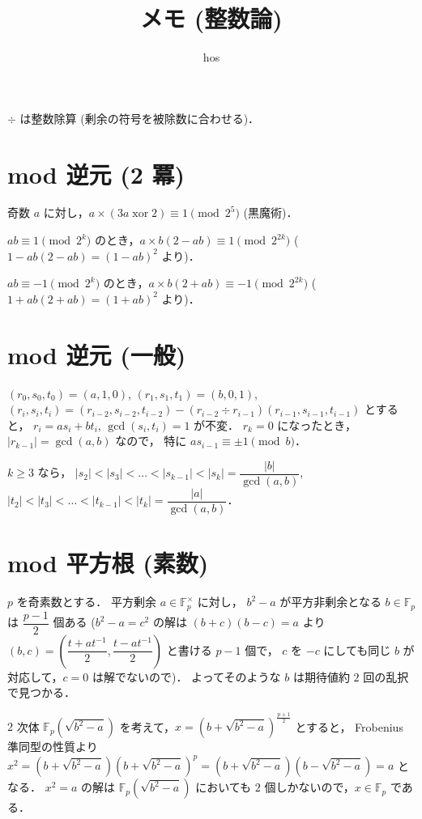 \documentclass{jsarticle}
\title{メモ (整数論)}
\author{hos}
\DeclareMathOperator{\xor}{xor}
\newcommand{\F}{\mathbb{F}}
\begin{document}
\maketitle

$\div$ は整数除算 (剰余の符号を被除数に合わせる)．


\section{mod 逆元 (2 冪)}
奇数 $a$ に対し，$a \times (3a \xor 2) \equiv 1 \pmod{2^5}$ (黒魔術)．

$a b \equiv 1 \pmod{2^k}$ のとき，$a \times b (2 - a b) \equiv 1 \pmod{2^{2k}}$ ($1 - a b (2 - a b) = (1 - a b)^2$ より)．

$a b \equiv -1 \pmod{2^k}$ のとき，$a \times b (2 + a b) \equiv -1 \pmod{2^{2k}}$ ($1 + a b (2 + a b) = (1 + a b)^2$ より)．


\section{mod 逆元 (一般)}
$(r_0, s_0, t_0) = (a, 1, 0)$, 
$(r_1, s_1, t_1) = (b, 0, 1)$, 
$(r_i, s_i, t_i) = (r_{i-2}, s_{i-2}, t_{i-2}) - (r_{i-2} \div r_{i-1}) (r_{i-1}, s_{i-1}, t_{i-1})$ とすると，
$r_i = a s_i + b t_i$, $\gcd(s_i, t_i) = 1$ が不変．
$r_k = 0$ になったとき，$\lvert r_{k-1} \rvert = \gcd(a, b)$ なので，
特に $a s_{i-1} \equiv \pm 1 \pmod{b}$．

$k \ge 3$ なら，
$|s_2| < |s_3| < \dots < |s_{k-1}| < |s_k| = \dfrac{\lvert b \rvert}{\gcd(a, b)}$, 
$|t_2| < |t_3| < \dots < |t_{k-1}| < |t_k| = \dfrac{\lvert a \rvert}{\gcd(a, b)}$．


\section{mod 平方根 (素数)}
$p$ を奇素数とする．
平方剰余 $a \in \F_p^\times$ に対し，
$b^2 - a$ が平方非剰余となる $b \in \F_p$ は $\dfrac{p - 1}{2}$ 個ある ($b^2 - a = c^2$ の解は
$(b + c) (b - c) = a$ より $(b, c) = \left(\dfrac{t + a t^{-1}}{2}, \dfrac{t - a t^{-1}}{2}\right)$ と書ける $p - 1$ 個で，
$c$ を $-c$ にしても同じ $b$ が対応して，$c = 0$ は解でないので)．
よってそのような $b$ は期待値約 $2$ 回の乱択で見つかる．

$2$ 次体 $\F_p(\sqrt{b^2 - a})$ を考えて，$x = \left(b + \sqrt{b^2 - a}\right)^{\frac{p+1}{2}}$ とすると，
Frobenius 準同型の性質より $x^2 = \left(b + \sqrt{b^2 - a}\right) \left(b + \sqrt{b^2 - a}\right)^p = \left(b + \sqrt{b^2 - a}\right) \left(b - \sqrt{b^2 - a}\right) = a$ となる．
$x^2 = a$ の解は $\F_p(\sqrt{b^2 - a})$ においても $2$ 個しかないので，$x \in \F_p$ である．
\end{document}
